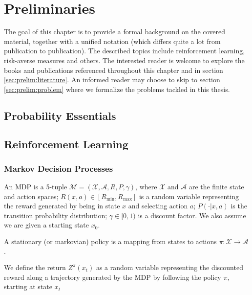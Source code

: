 \chapter{Preliminaries}\label{ch:prelim}

The goal of this chapter is to provide a formal background on the covered material, together with a unified notation (which differs quite a lot from publication to publication). The described topics include reinforcement learning, risk-averse measures and others. The interested reader is welcome to explore the books and publications referenced throughout this chapter and in section \ref{sec:prelim:literature}. An informed reader may choose to skip to section \ref{sec:prelim:problem} where we formalize the problems tackled in this thesis.

\section{Probability Essentials}



\section{Reinforcement Learning}\label{sec:prelim:rl}


\subsection{Markov Decision Processes}
An MDP is a 5-tuple $\mathcal{M} = (\mathcal{X}, \mathcal{A}, R, P, \gamma)$, where $\mathcal{X}$ and $\mathcal{A}$ are the finite state and action spaces; $R(x, a) \in [R_{\min}, R_{\max}]$ is a random variable representing the reward generated by being in state $x$ and selecting action $a$; $P(\cdot|x, a)$ is the transition probability distribution; $\gamma \in [0, 1)$ is a discount factor. We also assume we are given a starting state $x_0$.


A stationary (or markovian) policy is a mapping from states to actions $\pi:\mathcal{X} \to \mathcal{A}$.

We define the return $Z^\pi(x_t)$ as a random variable representing the discounted reward along a trajectory generated by the MDP by following the policy $\pi$, starting at state $x_t$

